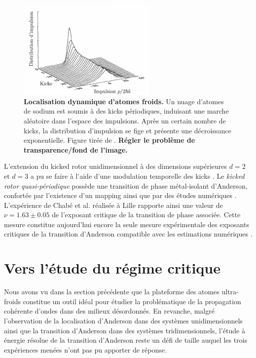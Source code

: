 \begin{figure}
\centering
\includegraphics[width=0.6\textwidth]{Fig/Localisation/kicked_rotor.pdf}
\caption{\textbf{Localisation dynamique d'atomes froids.} Un nuage d'atomes de sodium est soumis à des kicks périodiques, induisant une marche aléatoire dans l'espace des impulsions. Après un certain nombre de kicks, la distribution d'impulsion se fige et présente une décroissance exponentielle. Figure tirée de \citep{moore1995atom}. \textbf{Régler le problème de transparence/fond de l'image.}}
\label{fig:kicked_rotors}
\end{figure}

L'extension du kicked rotor unidimensionnel à des dimensions supérieures $d=2$ et $d=3$ a pu se faire à l'aide d'une modulation temporelle des kicks \citep{casati1989anderson}. Le \emph{kicked rotor quasi-périodique} possède une transition de phase métal-isolant d'Anderson, confortée par l'existence d'un mapping \citep{lemarie2009observation} ainsi que par des études numériques \citep{lemarie2009universality}. L'expérience de Chabé et al. réalisée à Lille rapporte ainsi une valeur de $\nu=1.63\pm0.05$ de l'exposant critique de la transition de phase associée. Cette mesure constitue aujourd'hui encore la seule mesure expérimentale des exposants critiques de la transition d'Anderson compatible avec les estimations numériques \citep{chabe2008experimental}\citep{lopez2012experimental}.








\section{Vers l'étude du régime critique}
Nous avons vu dans la section précédente que la plateforme des atomes ultra-froids constitue un outil idéal pour étudier la problématique de la propagation cohérente d'ondes dans des milieux désordonnés. En revanche, malgré l'observation de la localisation d'Anderson dans des systèmes unidimensionnels ainsi que la transition d'Anderson dans des systèmes tridimensionnels, l'étude à énergie résolue de la transition d'Anderson reste un défi de taille auquel les trois expériences menées n'ont pas pu apporter de réponse.

